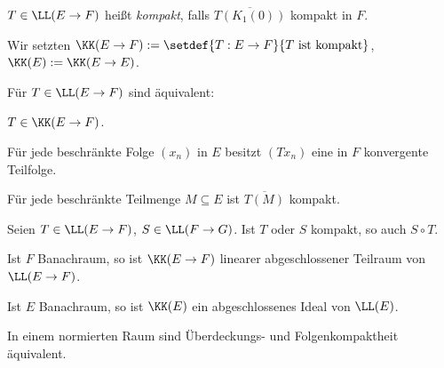 \begin{defn}
\label{defn:6.7}
$T\in\LL(E\to F)$ heißt \emph{kompakt}, falls
$\overline{T(K_1(0))}$ kompakt in $F$.

Wir setzten $\KK(E\to F) := \setdef{T:E\to F}{T\text{ ist kompakt}}$,
$\KK(E):=\KK(E\to E)$.\fishhere
\end{defn}

\begin{prop}
\label{prop:6.8}
\begin{propenum}
  \item Für $T\in \LL(E\to F)$ sind äquivalent:
\begin{equivenum}
  \item\label{prop:6.8:1.1} $T\in\KK(E\to F)$.
  \item\label{prop:6.8:1.2} Für jede beschränkte Folge $(x_n)$ in $E$ besitzt
  $(Tx_n)$ eine in $F$ konvergente Teilfolge.
  \item\label{prop:6.8:1.3} Für jede beschränkte Teilmenge $M\subseteq E$ ist
  $\overline{T(M)}$ kompakt.
\end{equivenum}
\item Seien $T\in\LL(E\to F)$, $S\in\LL(F\to G)$. Ist $T$ oder $S$ kompakt, so
 auch $S\circ T$.
 \item Ist $F$ Banachraum, so ist $\KK(E\to F)$ linearer abgeschlossener
 Teilraum von $\LL(E\to F)$.
 \item Ist $E$ Banachraum, so ist $\KK(E)$ ein abgeschlossenes Ideal von
 $\LL(E)$.\fishhere
\end{propenum}
\end{prop}

\begin{bemn}[Vorbemerkung.]
In einem normierten Raum sind Überdeckungs- und Folgenkompaktheit
äquivalent.\maphere
\end{bemn}

